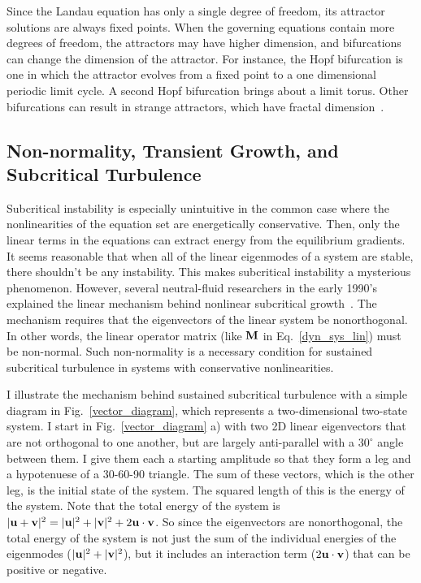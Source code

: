 Since the Landau equation has only a single degree of freedom, its attractor solutions are always fixed points. When the governing equations contain more degrees of freedom, the attractors
may have higher dimension, and bifurcations can change the dimension of the attractor. For instance, the Hopf bifurcation is one in which the attractor evolves from a fixed point to a one dimensional
periodic limit cycle. A second Hopf bifurcation brings about a limit torus. Other bifurcations can result in strange attractors, which have fractal dimension~\cite{manneville2004}.

\subsection{Non-normality, Transient Growth, and Subcritical Turbulence}
\label{s_nonormality}

Subcritical instability is especially unintuitive in the common case where the nonlinearities of the equation set are energetically conservative. Then, only
the linear terms in the equations can extract energy from the equilibrium gradients. It seems reasonable that when all of the linear eigenmodes of a system are stable, there shouldn't be
any instability. This makes subcritical instability a mysterious phenomenon. However, several neutral-fluid researchers in the early 1990's explained the linear mechanism behind nonlinear subcritical
growth~\cite{gustavsson1991,butler1992,reddy1993,reddy1993b,trefethen1993,henningson1994,henningson1996}. The mechanism requires that the eigenvectors of the linear system be nonorthogonal.
In other words, the linear operator matrix (like ${\bf M}$ in Eq.~\ref{dyn_sys_lin}) must be non-normal. 
Such non-normality is a necessary condition for sustained subcritical turbulence in systems with conservative nonlinearities.

I illustrate the mechanism behind sustained subcritical turbulence with a simple diagram in Fig.~\ref{vector_diagram}, which represents a two-dimensional two-state system. 
I start in Fig.~\ref{vector_diagram} a) with two 2D linear eigenvectors that are not orthogonal to one another, but are largely anti-parallel with a $30^\circ$ angle between them. 
I give them each a starting amplitude so that they form a leg and a hypotenuese of a 30-60-90 triangle. The sum of these vectors, which is the other leg, is the initial state of the system.
The squared length of this is the energy of the system. Note that the total energy of the system is $|{\bf u} + {\bf v}|^2 = |{\bf u}|^2 + |{\bf v}|^2 + 2 {\bf u} \cdot {\bf v}$. So since the
eigenvectors are nonorthogonal, the total energy of the system is not just the sum of the individual energies of the eigenmodes ($|{\bf u}|^2 + |{\bf v}|^2$), but it includes an interaction
term ($2 {\bf u} \cdot {\bf v}$) that can be positive or negative.

